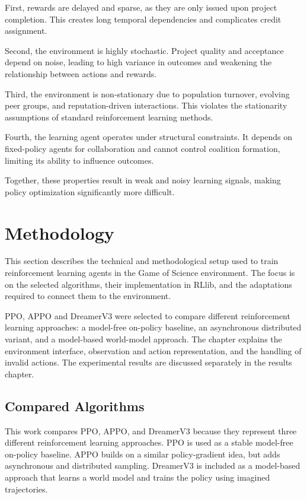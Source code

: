 \documentclass[english,bachelor]{hsluthesis}
\begin{document}
First, rewards are delayed and sparse, as they are only issued upon project completion. This creates long temporal dependencies and complicates credit assignment.

Second, the environment is highly stochastic. Project quality and acceptance depend on noise, leading to high variance in outcomes and weakening the relationship between actions and rewards.

Third, the environment is non-stationary due to population turnover, evolving peer groups, and reputation-driven interactions. This violates the stationarity assumptions of standard reinforcement learning methods.

Fourth, the learning agent operates under structural constraints. It depends on fixed-policy agents for collaboration and cannot control coalition formation, limiting its ability to influence outcomes.

Together, these properties result in weak and noisy learning signals, making policy optimization significantly more difficult.

\chapter{Methodology}

This section describes the technical and methodological setup used to train reinforcement learning agents in the Game of Science environment. The focus is on the selected algorithms, their implementation in RLlib, and the adaptations required to connect them to the environment.

PPO, APPO and DreamerV3 were selected to compare different reinforcement learning approaches: a model-free on-policy baseline, an asynchronous distributed variant, and a model-based world-model approach. The chapter explains the environment interface, observation and action representation, and the handling of invalid actions. The experimental results are discussed separately in the results chapter.

\section{Compared Algorithms}

This work compares PPO, APPO, and DreamerV3 because they represent three different reinforcement learning approaches. PPO is used as a stable model-free on-policy baseline. APPO builds on a similar policy-gradient idea, but adds asynchronous and distributed sampling. DreamerV3 is included as a model-based approach that learns a world model and trains the policy using imagined trajectories.
\end{document}
